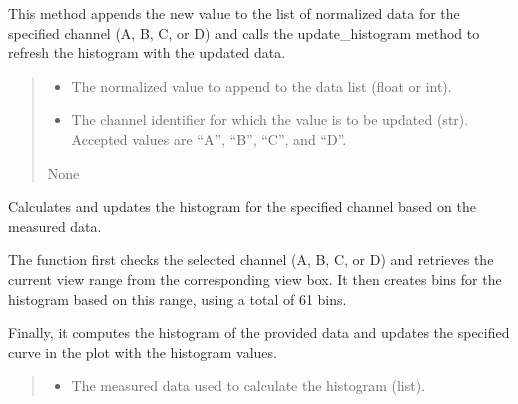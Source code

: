 \documentclass[letterpaper,10pt,english]{sphinxmanual}
\begin{document}
\begin{fulllineitems}
\begin{fulllineitems}
\sphinxAtStartPar
This method appends the new value to the list of normalized data for the specified channel 
(A, B, C, or D) and calls the update\_histogram method to refresh the histogram with the 
updated data.
\begin{quote}\begin{description}
\begin{itemize}
\item {} 
\sphinxAtStartPar
{} \textendash{} The normalized value to append to the data list (float or int).

\item {} 
\sphinxAtStartPar
{} \textendash{} The channel identifier for which the value is to be updated (str). 
Accepted values are “A”, “B”, “C”, and “D”.

\end{itemize}

\sphinxAtStartPar
None

\end{description}\end{quote}

\end{fulllineitems}


\begin{fulllineitems}
\label{\detokenize{StartStopHist:StartStopHist.StartStopLogic.update_histogram}}
\pysigstartsignatures
{}
\pysigstopsignatures
\sphinxAtStartPar
Calculates and updates the histogram for the specified channel based on the measured data.

\sphinxAtStartPar
The function first checks the selected channel (A, B, C, or D) and retrieves the 
current view range from the corresponding view box. It then creates bins for the 
histogram based on this range, using a total of 61 bins.

\sphinxAtStartPar
Finally, it computes the histogram of the provided data and updates the specified 
curve in the plot with the histogram values.
\begin{quote}\begin{description}
\begin{itemize}
\item {} 
\sphinxAtStartPar
{} \textendash{} The measured data used to calculate the histogram (list).


\end{itemize}
\end{description}
\end{quote}
\end{fulllineitems}
\end{fulllineitems}
\end{document}
